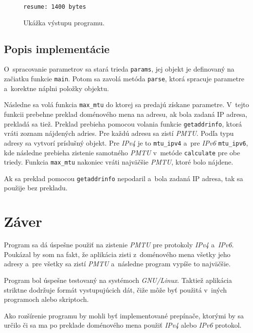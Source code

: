 \documentclass[12pt,a4paper,titlepage]{article}
\begin{document}
        \begin{figure}[h!]
            \begin{center}
                \texttt{resume: 1400\ bytes}
                \caption{Ukážka výstupu programu.}
                \label{vystup}
            \end{center}
        \end{figure}

    \subsection{Popis implementácie}
        O~spracovanie parametrov sa stará trieda \texttt{params}, jej objekt 
        je definovaný na začiatku funkcie \texttt{main}. Potom sa zavolá metóda \texttt{parse},
        ktorá spracuje parametre a~korektne náplni položky objektu.
        
        Následne sa volá funkcia \texttt{max\_mtu} do ktorej sa predajú získane parametre. 
        V~tejto funkcii prebehne preklad doménového mena na adresu, ak bola zadaná IP adresa, 
        prekladá sa tiež. Preklad prebieha pomocou volania funkcie \texttt{getaddrinfo}, ktorá 
        vráti zoznam nájdených adries. Pre každú adresu sa zistí \emph{PMTU}. Podľa typu adresy sa
        vytvorí príslušný objekt. Pre \emph{IPv4} je to \texttt{mtu\_ipv4} a~pre \emph{IPv6}
        \texttt{mtu\_ipv6}, kde následne prebieha zistenie samotného \emph{PMTU}
v~metóde \texttt{calculate} pre obe triedy.
        Funkcia \texttt{max\_mtu} nakoniec vráti najväčšie \emph{PMTU}, ktoré bolo nájdene.
        
        Ak sa preklad pomocou \texttt{getaddrinfo} nepodaril a~bola zadaná IP adresa,
        tak sa použije bez prekladu.

    \section{Záver} \label{zaver}
        Program sa dá úspešne použiť na zistenie
        \emph{PMTU} pre protokoly \emph{IPv4} a~\emph{IPv6}.
        Poukázal by som na fakt, že aplikácia zisti z~doménového mena všetky
        jeho adresy a~pre všetky sa zistí \emph{PMTU} a~následne program vypíše to najväčšie.

        Program bol úspešne testovaný na systémoch \emph{GNU/Linux}. Taktiež aplikácia 
        striktne dodržuje formát vystupujúcich dát, čiže môže byť použitá 
        v~iných programoch alebo skriptoch.

        Ako rozšírenie programu by mohli byť implementované prepínače, ktorými by sa určilo či sa
        ma po preklade doménového mena použiť \emph{IPv4} alebo \emph{IPv6} protokol.
\end{document}
